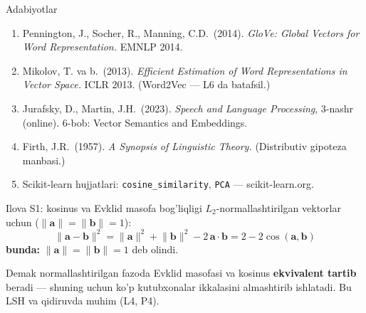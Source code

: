 \documentclass[aspectratio=169,11pt]{beamer}
\newcommand{\bunda}[1]{{\small\textbf{bunda:}\; #1}}
\begin{document}
\begin{frame}{Adabiyotlar}
  \begin{enumerate}\small\setlength\itemsep{6pt}
    \item Pennington, J., Socher, R., Manning, C.D.\ (2014).
          \textit{GloVe: Global Vectors for Word Representation.}
          EMNLP 2014.
    \item Mikolov, T. va b.\ (2013).
          \textit{Efficient Estimation of Word Representations in
          Vector Space.} ICLR 2013. (Word2Vec --- L6 da batafsil.)
    \item Jurafsky, D., Martin, J.H.\ (2023).
          \textit{Speech and Language Processing}, 3-nashr (online).
          6-bob: Vector Semantics and Embeddings.
    \item Firth, J.R.\ (1957). \textit{A Synopsis of Linguistic Theory.}
          (Distributiv gipoteza manbasi.)
    \item Scikit-learn hujjatlari: \texttt{cosine\_similarity},
          \texttt{PCA} --- scikit-learn.org.
  \end{enumerate}
\end{frame}

\appendix

\begin{frame}{Ilova S1: kosinus va Evklid masofa bog'liqligi}
  \small
  $L_2$-normallashtirilgan vektorlar uchun
  ($\lVert\mathbf{a}\rVert=\lVert\mathbf{b}\rVert=1$):
  $$\lVert\mathbf{a}-\mathbf{b}\rVert^2
    = \lVert\mathbf{a}\rVert^2 + \lVert\mathbf{b}\rVert^2
      - 2\,\mathbf{a}\cdot\mathbf{b}
    = 2 - 2\cos(\mathbf{a},\mathbf{b})$$
  \bunda{$\lVert\mathbf{a}\rVert=\lVert\mathbf{b}\rVert=1$ deb olindi.}
  \vspace{4pt}

  Demak normallashtirilgan fazoda Evklid masofasi va kosinus
  \textbf{ekvivalent tartib} beradi --- shuning uchun ko'p kutubxonalar
  ikkalasini almashtirib ishlatadi. Bu LSH va qidiruvda muhim (L4, P4).
\end{frame}
\end{document}
